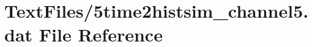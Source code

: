\hypertarget{5time2histsim__channel5_8dat}{}\section{Text\+Files/5time2histsim\+\_\+channel5.dat File Reference}
\label{5time2histsim__channel5_8dat}
